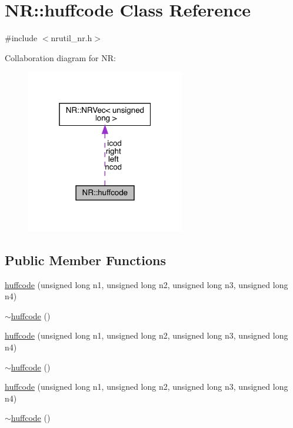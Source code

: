 \hypertarget{classNR_1_1huffcode}{}\section{NR\+:\+:huffcode Class Reference}
\label{classNR_1_1huffcode}


{\ttfamily \#include $<$nrutil\+\_\+nr.\+h$>$}



Collaboration diagram for NR\+:\nopagebreak
\begin{figure}[H]
\begin{center}
\leavevmode
\includegraphics[width=196pt]{de/dd5/classNR_1_1huffcode__coll__graph}
\end{center}
\end{figure}
\subsection*{Public Member Functions}
\begin{DoxyCompactItemize}
\item 
\mbox{\hyperlink{classNR_1_1huffcode_adf21f7c173d14b46a90ca8295cfc61fd}{huffcode}} (unsigned long n1, unsigned long n2, unsigned long n3, unsigned long n4)
\item 
\mbox{\hyperlink{classNR_1_1huffcode_a414a1322987c65cead6e5a0b20727f0f}{$\sim$huffcode}} ()
\item 
\mbox{\hyperlink{classNR_1_1huffcode_adf21f7c173d14b46a90ca8295cfc61fd}{huffcode}} (unsigned long n1, unsigned long n2, unsigned long n3, unsigned long n4)
\item 
\mbox{\hyperlink{classNR_1_1huffcode_a414a1322987c65cead6e5a0b20727f0f}{$\sim$huffcode}} ()
\item 
\mbox{\hyperlink{classNR_1_1huffcode_adf21f7c173d14b46a90ca8295cfc61fd}{huffcode}} (unsigned long n1, unsigned long n2, unsigned long n3, unsigned long n4)
\item 
\mbox{\hyperlink{classNR_1_1huffcode_a414a1322987c65cead6e5a0b20727f0f}{$\sim$huffcode}} ()
\end{DoxyCompactItemize}

